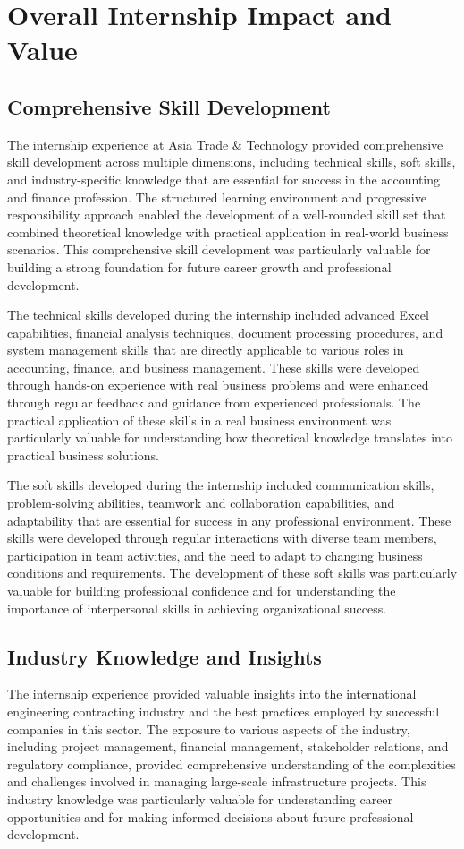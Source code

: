 \section{Overall Internship Impact and Value}

\subsection{Comprehensive Skill Development}
The internship experience at Asia Trade \& Technology provided comprehensive skill development across multiple dimensions, including technical skills, soft skills, and industry-specific knowledge that are essential for success in the accounting and finance profession. The structured learning environment and progressive responsibility approach enabled the development of a well-rounded skill set that combined theoretical knowledge with practical application in real-world business scenarios. This comprehensive skill development was particularly valuable for building a strong foundation for future career growth and professional development.

The technical skills developed during the internship included advanced Excel capabilities, financial analysis techniques, document processing procedures, and system management skills that are directly applicable to various roles in accounting, finance, and business management. These skills were developed through hands-on experience with real business problems and were enhanced through regular feedback and guidance from experienced professionals. The practical application of these skills in a real business environment was particularly valuable for understanding how theoretical knowledge translates into practical business solutions.

The soft skills developed during the internship included communication skills, problem-solving abilities, teamwork and collaboration capabilities, and adaptability that are essential for success in any professional environment. These skills were developed through regular interactions with diverse team members, participation in team activities, and the need to adapt to changing business conditions and requirements. The development of these soft skills was particularly valuable for building professional confidence and for understanding the importance of interpersonal skills in achieving organizational success.

\subsection{Industry Knowledge and Insights}
The internship experience provided valuable insights into the international engineering contracting industry and the best practices employed by successful companies in this sector. The exposure to various aspects of the industry, including project management, financial management, stakeholder relations, and regulatory compliance, provided comprehensive understanding of the complexities and challenges involved in managing large-scale infrastructure projects. This industry knowledge was particularly valuable for understanding career opportunities and for making informed decisions about future professional development.

